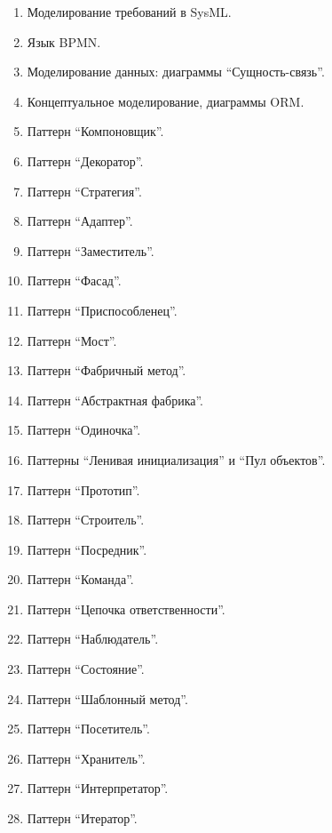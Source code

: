 \documentclass[a5paper]{article}
\begin{document}
\begin{enumerate}
    \item Моделирование требований в SysML.
    \item Язык BPMN.
    \item Моделирование данных: диаграммы \enquote{Сущность-связь}.
    \item Концептуальное моделирование, диаграммы ORM.
    \item Паттерн \enquote{Компоновщик}.
    \item Паттерн \enquote{Декоратор}.
    \item Паттерн \enquote{Стратегия}.
    \item Паттерн \enquote{Адаптер}.
    \item Паттерн \enquote{Заместитель}.
    \item Паттерн \enquote{Фасад}.
    \item Паттерн \enquote{Приспособленец}.
    \item Паттерн \enquote{Мост}.
    \item Паттерн \enquote{Фабричный метод}.
    \item Паттерн \enquote{Абстрактная фабрика}.
    \item Паттерн \enquote{Одиночка}.
    \item Паттерны \enquote{Ленивая инициализация} и \enquote{Пул объектов}.
    \item Паттерн \enquote{Прототип}.
    \item Паттерн \enquote{Строитель}.
    \item Паттерн \enquote{Посредник}.
    \item Паттерн \enquote{Команда}.
    \item Паттерн \enquote{Цепочка ответственности}.
    \item Паттерн \enquote{Наблюдатель}.
    \item Паттерн \enquote{Состояние}.
    \item Паттерн \enquote{Шаблонный метод}.
    \item Паттерн \enquote{Посетитель}.
    \item Паттерн \enquote{Хранитель}.
    \item Паттерн \enquote{Интерпретатор}.
    \item Паттерн \enquote{Итератор}.

\end{enumerate}
\end{document}
